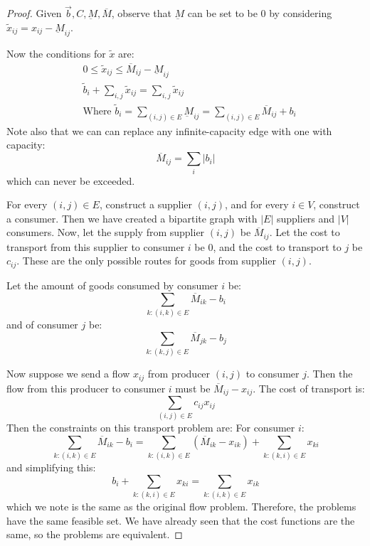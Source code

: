 \documentclass[../Main.tex]{subfiles}
\begin{document}
\begin{proof}
    Given $\vec{b}, C, \underbar{M}, \overline{M}$, observe that $\underbar{M}$ can be set to be $0$ by considering $\tilde{x}_{ij} = x_{ij} - \underbar{M}_{ij}$.

    Now the conditions for $\tilde{x}$ are:
    \begin{align*}
        &0 \leq \tilde{x}_{ij} \leq \overline{M}_{ij} - \underbar{M}_{ij} \\
        &\tilde{b}_i + \sum_{i, j} \tilde{x}_{ij} = \sum_{i, j} \tilde{x}_{ij} \\
        &\text{Where } \tilde{b}_i = \sum_{(i, j) \in E} \underbar{M}_{ij} = \sum_{(i, j) \in E} \overline{M}_{ij} + b_i
    \end{align*}
    Note also that we can can replace any infinite-capacity edge with one with capacity:
    \begin{equation*}
        \overline{M}_{ij} = \sum_i |b_i|
    \end{equation*}
    which can never be exceeded.

    For every $(i, j) \in E$, construct a supplier $(i, j)$, and for every $i \in V$, construct a consumer. Then we have created a bipartite graph with $|E|$ suppliers and $|V|$ consumers. Now, let the supply from supplier $(i, j)$ be $\overline{M}_{ij}$. Let the cost to transport from this supplier to consumer $i$ be 0, and the cost to transport to $j$ be $c_{ij}$. These are the only possible routes for goods from supplier $(i, j)$.
    
    Let the amount of goods consumed by consumer $i$ be:
    \begin{equation*}
        \sum_{k : (i, k) \in E} \overline{M}_{ik} - b_i
    \end{equation*}
    and of consumer $j$ be:
    \begin{equation*}
        \sum_{k : (k, j) \in E} \overline{M}_{jk} - b_j
    \end{equation*}

    Now suppose we send a flow $x_{ij}$ from producer $(i, j)$ to consumer $j$. Then the flow from this producer to consumer $i$ must be $\overline{M}_{ij} - x_{ij}$. The cost of transport is:
    \begin{equation*}
        \sum_{(i, j) \in E} c_{ij} x_{ij}
    \end{equation*}
    Then the constraints on this transport problem are:
    For consumer $i$:
    \begin{equation*}
        \sum_{k : (i, k) \in E} \overline{M}_{ik} - b_i = \sum_{k : (i, k) \in E} (\overline{M}_{ik} - x_{ik}) + \sum_{k : (k, i) \in E} x_{ki}
    \end{equation*}
    and simplifying this:
    \begin{equation*}
        b_i + \sum_{k : (k, i) \in E} x_{ki} = \sum_{k : (i, k) \in E} x_{ik}
    \end{equation*}
    which we note is the same as the original flow problem. Therefore, the problems have the same feasible set. We have already seen that the cost functions are the same, so the problems are equivalent.
\end{proof}
\end{document}
